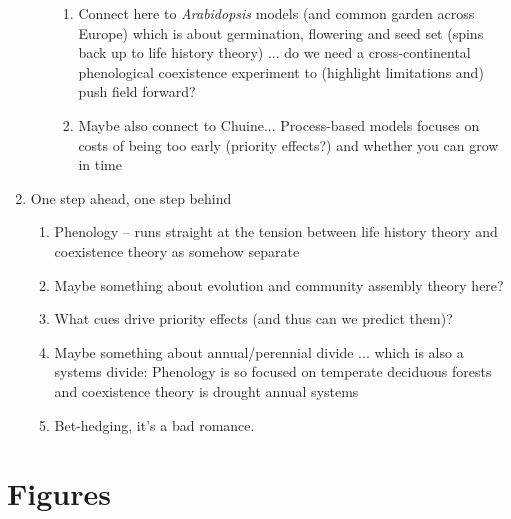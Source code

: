 \documentclass[11pt,letter]{article}
\begin{document}
\begin{enumerate}
\begin{enumerate}
\begin{enumerate}
\item Connect here to \emph{Arabidopsis} models (and common garden across Europe) which is about germination, flowering and seed set (spins back up to life history theory) ... do we need a cross-continental phenological coexistence experiment to (highlight limitations and) push field forward? 
\item Maybe also connect to Chuine... Process-based models focuses on costs of being too early (priority effects?) and whether you can grow in time
\end{enumerate}
\end{enumerate}
\item One step ahead, one step behind %
\begin{enumerate}
\item Phenology -- runs straight at the tension between life history theory and coexistence theory as somehow separate %
\item Maybe something about evolution and community assembly theory here? %
\item What cues drive priority effects (and thus can we predict them)?
\item Maybe something about annual/perennial divide ... which is also a systems divide: Phenology is so focused on temperate deciduous forests and coexistence theory is drought annual systems 
\item Bet-hedging, it's a bad romance. 
\end{enumerate}
\end{enumerate}



\section{Figures}
\end{document}

